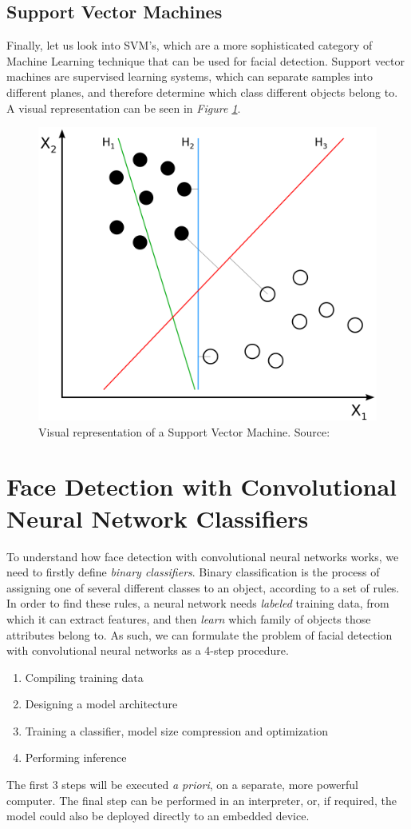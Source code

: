 \subsection{Support Vector Machines}
Finally, let us look into SVM's, which are a more sophisticated category of Machine Learning technique that can be used for facial detection. Support vector machines are supervised learning systems, which can separate samples into different planes, and therefore determine which class different objects belong to. A visual representation can be seen in \textit{Figure \ref{fig:svm}}. \cite{svm}
\begin{figure}
    \centering
    \includegraphics[width = 10 cm]{images/Svm_separating_hyperplanes_(SVG).svg.png}
    \caption{Visual representation of a Support Vector Machine. Source: \cite{svm_pic}}
    \label{fig:svm}
\end{figure}

\section{Face Detection with Convolutional Neural Network Classifiers}
To understand how face detection with convolutional neural networks works, we need to firstly define \textit{binary classifiers}. Binary classification is the process of assigning one of several different classes to an object, according to a set of rules. In order to find these rules, a neural network needs \textit{labeled} training data, from which it can extract features, and then \textit{learn} which family of objects those attributes belong to. As such, we can formulate the problem of facial detection with convolutional neural networks as a 4-step procedure.
\begin{enumerate}
    \item Compiling training data
    \item Designing a model architecture
    \item Training a classifier, model size compression and optimization
    \item Performing inference
\end{enumerate}
The first 3 steps will be executed \textit{a priori}, on a separate, more powerful computer. The final step can be performed in an interpreter, or, if required, the model could also be deployed directly to an embedded device.


